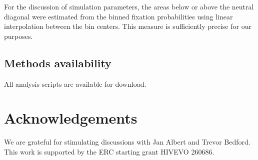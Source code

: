 \documentclass[rmp, twocolumn]{revtex4}
\begin{document}
For the discussion of simulation parameters, the areas below or above the neutral
diagonal were estimated from the binned fixation probabilities using linear
interpolation between the bin centers. This measure is sufficiently precise for
our purposes.

\subsection{Methods availability}
All analysis scripts are available for download.

\section*{Acknowledgements}
We are grateful for stimulating discussions with Jan Albert and Trevor Bedford.
This work is supported by the ERC starting grant HIVEVO 260686.



\end{document}
